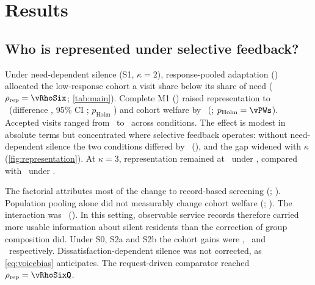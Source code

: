 \section{Results}
\label{sec:results}

\subsection{Who is represented under selective feedback?}
\label{sec:representationresults}
Under need-dependent silence (S1, $\kappa=2$), response-pooled adaptation () allocated the low-response cohort a visit share below its share of need ($\rho_{\mathrm{rep}}=\vRhoSix$; \cref{tab:main}). Complete M1 () raised representation to \vRhoSevenR\ (difference \vDRho, 95\% CI \vDRhoCI; $p_{\mathrm{Holm}}$ \vPRho) and cohort welfare by \vDWs\ (\vDWsCI; $p_{\mathrm{Holm}}=\vPWs$). Accepted visits ranged from \vVisitsLo\ to \vVisitsHi\ across conditions. The effect is modest in absolute terms but concentrated where selective feedback operates: without need-dependent silence the two conditions differed by \vKzeroDRho\ (\vKzeroDRhoCI), and the gap widened with $\kappa$ (\cref{fig:representation}). At $\kappa=3$, representation remained at \vKthreeRhoSevenR\ under , compared with \vKthreeRhoSix\ under .

The factorial attributes most of the change to record-based screening (\vScrMain; \vScrMainCI). %
Population pooling alone did not measurably change cohort welfare (\vIPWmain; \vIPWmainCI). %
The interaction was \vInter\ (\vInterCI). In this setting, observable service records therefore carried more usable information about silent residents than the correction of group composition did. Under S0, S2a and S2b the cohort gains were \vSzeroDWs, \vStwoaDWs\ and \vStwobDWs\ respectively. Dissatisfaction-dependent silence was not corrected, as \cref{eq:voicebias} anticipates. The request-driven comparator  reached $\rho_{\mathrm{rep}}=\vRhoSixQ$.

